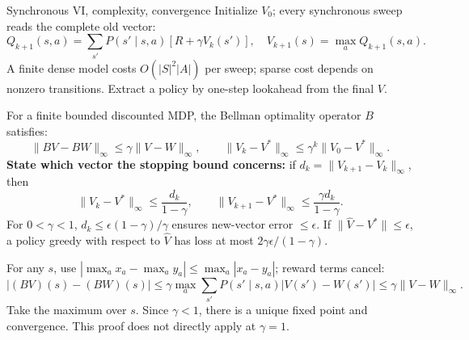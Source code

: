 \documentclass[10pt,a4paper]{article}
\begin{document}
\begin{card}{Synchronous VI, complexity, convergence}
Initialize $V_0$; every synchronous sweep reads the complete old vector:
\[
Q_{k+1}(s,a)=\sum_{s'}P(s'\mid s,a)[R+\gamma V_k(s')],
\quad V_{k+1}(s)=\max_aQ_{k+1}(s,a).
\]
A finite dense model costs $O(|S|^2|A|)$ per sweep; sparse cost depends on nonzero transitions. Extract a policy by one-step lookahead from the final $V$.

For a finite bounded discounted MDP, the Bellman optimality operator $B$ satisfies:
\[
\|BV-BW\|_\infty\le\gamma\|V-W\|_\infty,
\qquad \|V_k-V^*\|_\infty\le\gamma^k\|V_0-V^*\|_\infty.
\]
\textbf{State which vector the stopping bound concerns:} if $d_k=\|V_{k+1}-V_k\|_\infty$, then
\[
\|V_k-V^*\|_\infty\le\frac{d_k}{1-\gamma},\qquad
\|V_{k+1}-V^*\|_\infty\le\frac{\gamma d_k}{1-\gamma}.
\]
For $0<\gamma<1$, $d_k\le\epsilon(1-\gamma)/\gamma$ ensures new-vector error $\le\epsilon$. If $\|\hat V-V^*\|\le\epsilon$, a policy greedy with respect to $\hat V$ has loss at most $2\gamma\epsilon/(1-\gamma)$.
\end{card}

\begin{prf}
For any $s$, use $|\max_a x_a-\max_a y_a|\le\max_a|x_a-y_a|$; reward terms cancel:
\[
|(BV)(s)-(BW)(s)|\le\gamma\max_a\sum_{s'}P(s'\mid s,a)|V(s')-W(s')|
\le\gamma\|V-W\|_\infty.
\]
Take the maximum over $s$. Since $\gamma<1$, there is a unique fixed point and convergence. This proof does not directly apply at $\gamma=1$.
\end{prf}
\end{document}
